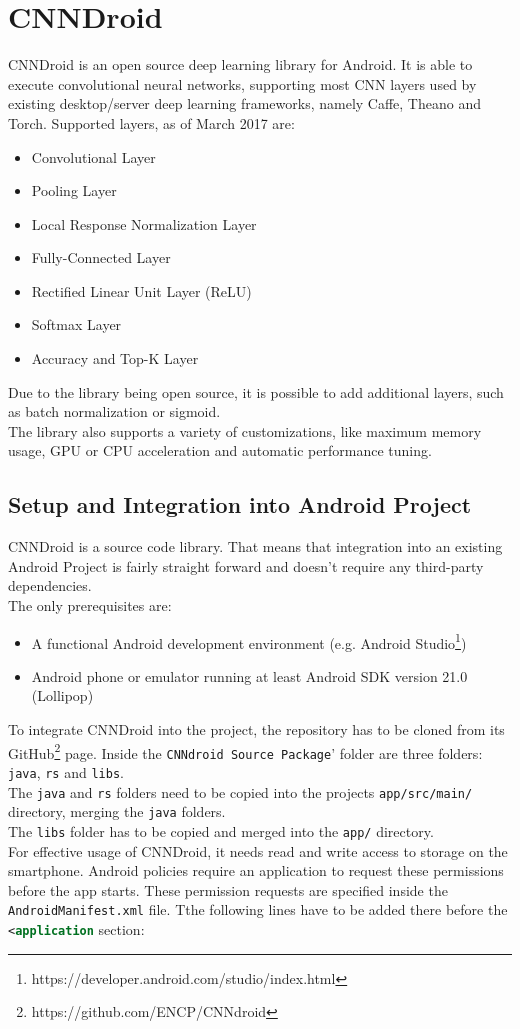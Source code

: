 \section{CNNDroid}
CNNDroid is an open source deep learning library for Android. It is able to execute convolutional neural networks, supporting most CNN layers used by existing desktop/server deep learning frameworks, namely Caffe, Theano and Torch. Supported layers, as of March 2017 are:
\begin{itemize}
    \item{Convolutional Layer}
    \item{Pooling Layer}
    \item{Local Response Normalization Layer}
    \item{Fully-Connected Layer}
    \item{Rectified Linear Unit Layer (ReLU)}
    \item{Softmax Layer}
    \item{Accuracy and Top-K Layer}
\end{itemize}
Due to the library being open source, it is possible to add additional layers, such as batch normalization or sigmoid.\\
The library also supports a variety of customizations, like maximum memory usage, GPU or CPU acceleration and automatic performance tuning.

\subsection{Setup and Integration into Android Project}
CNNDroid is a source code library. That means that integration into an existing Android Project is fairly straight forward and doesn't require any third-party dependencies.\\
The only prerequisites are:
\begin{itemize}
    \item{A functional Android development environment (e.g. Android Studio\footnote{https://developer.android.com/studio/index.html})}
    \item{Android phone or emulator running at least Android SDK version 21.0 (Lollipop)}
\end{itemize}

To integrate CNNDroid into the project, the repository has to be cloned from its GitHub\footnote{https://github.com/ENCP/CNNdroid} page. Inside the \texttt{CNNdroid Source Package}' folder are three folders: \texttt{java}, \texttt{rs} and \texttt{libs}.\\
The \texttt{java} and \texttt{rs} folders need to be copied into the projects \texttt{app/src/main/} directory, merging the \texttt{java} folders.\\
The \texttt{libs} folder has to be copied and merged into the \texttt{app/} directory.\\
For effective usage of CNNDroid, it needs read and write access to storage on the smartphone. Android policies require an application to request these permissions before the app starts. These permission requests are specified inside the \texttt{AndroidManifest.xml} file. Tthe following lines have to be added there before the \lstinline[language=XML]{<application} section:

